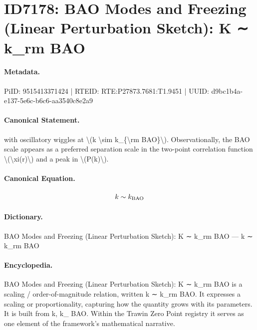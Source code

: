 \section*{ID7178: BAO Modes and Freezing (Linear Perturbation Sketch): K ∼ k\_rm BAO}
\paragraph{Metadata.}
PiID: 9515413371424 | RTEID: RTE:P27873.7681:T1.9451 | UUID: d9bc1b4a-e137-5e6c-b6c6-aa3540c8e2a9

\paragraph{Canonical Statement.}
with oscillatory wiggles at \textbackslash{}(k \textbackslash{}sim k\_\{\textbackslash{}rm BAO\}\textbackslash{}). Observationally, the BAO scale appears as a preferred separation scale in the two-point correlation function \textbackslash{}(\textbackslash{}xi(r)\textbackslash{}) and a peak in \textbackslash{}(P(k)\textbackslash{}).

\paragraph{Canonical Equation.}
\[
k \sim k_{\rm BAO}
\]

\paragraph{Dictionary.}
BAO Modes and Freezing (Linear Perturbation Sketch): K ∼ k\_rm BAO — k ∼ k\_rm BAO

\paragraph{Encyclopedia.}
BAO Modes and Freezing (Linear Perturbation Sketch): K ∼ k\_rm BAO is a scaling / order-of-magnitude relation, written k ∼ k\_rm BAO. It expresses a scaling or proportionality, capturing how the quantity grows with its parameters. It is built from k, k\_ BAO. Within the Trawin Zero Point registry it serves as one element of the framework's mathematical narrative.
